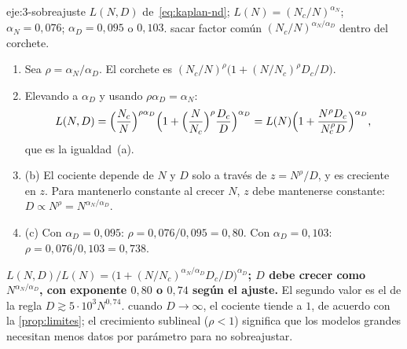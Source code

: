 \begin{solucion}{eje:3-sobreajuste}
\datos $L(N,D)$ de~\eqref{eq:kaplan-nd}; $L(N)=(N_c/N)^{\alpha_N}$; $\alpha_N=0{,}076$; $\alpha_D=0{,}095$ o $0{,}103$.
\planteamiento sacar factor común $(N_c/N)^{\alpha_N/\alpha_D}$ dentro del corchete.
\pasos
\begin{enumerate}[label=\arabic*.]
  \item Sea $\rho=\alpha_N/\alpha_D$. El corchete es $(N_c/N)^{\rho}\bigl(1+(N/N_c)^{\rho}D_c/D\bigr)$.
  \item Elevando a $\alpha_D$ y usando $\rho\alpha_D=\alpha_N$:
  \[
  L(N,D)=\Bigl(\frac{N_c}{N}\Bigr)^{\rho\alpha_D}\Bigl(1+\Bigl(\frac{N}{N_c}\Bigr)^{\rho}\frac{D_c}{D}\Bigr)^{\alpha_D}=L(N)\Bigl(1+\frac{N^{\rho}D_c}{N_c^{\rho}D}\Bigr)^{\alpha_D},
  \]
  que es la igualdad~(a).
  \item (b) El cociente depende de $N$ y $D$ solo a través de $z=N^{\rho}/D$, y es creciente en $z$. Para mantenerlo constante al crecer $N$, $z$ debe mantenerse constante: $D\propto N^{\rho}=N^{\alpha_N/\alpha_D}$.
  \item (c) Con $\alpha_D=0{,}095$: $\rho=0{,}076/0{,}095=0{,}80$. Con $\alpha_D=0{,}103$: $\rho=0{,}076/0{,}103=0{,}738$.
\end{enumerate}
\resultado \textbf{$L(N,D)/L(N)=\bigl(1+(N/N_c)^{\alpha_N/\alpha_D}D_c/D\bigr)^{\alpha_D}$; $D$ debe crecer como $N^{\alpha_N/\alpha_D}$, con exponente $0{,}80$ o $0{,}74$ según el ajuste.} El segundo valor es el de la regla $D\gtrsim 5\cdot 10^{3}N^{0{,}74}$.
\comprobacion cuando $D\to\infty$, el cociente tiende a $1$, de acuerdo con la \cref{prop:limites}; el crecimiento sublineal ($\rho<1$) significa que los modelos grandes necesitan menos datos por parámetro para no sobreajustar.
\end{solucion}

